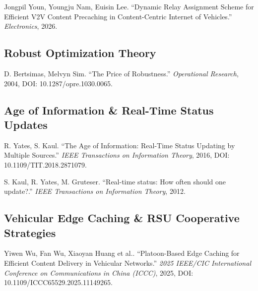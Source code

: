 \documentclass{article}
\begin{document}
Jongpil Youn, Youngju Nam, Euisin Lee. ``Dynamic Relay Assignment Scheme for Efficient V2V Content Precaching in Content-Centric Internet of Vehicles.'' 
\textit{Electronics}, 2026.



\subsection*{Robust Optimization Theory}

D. Bertsimas, Melvyn Sim. ``The Price of Robustness.'' 
\textit{Operational Research}, 2004, DOI: 10.1287/opre.1030.0065.



\subsection*{Age of Information \& Real-Time Status Updates}

R. Yates, S. Kaul. ``The Age of Information: Real-Time Status Updating by Multiple Sources.'' 
\textit{IEEE Transactions on Information Theory}, 2016, DOI: 10.1109/TIT.2018.2871079.

S. Kaul, R. Yates, M. Gruteser. ``Real-time status: How often should one update?.'' 
\textit{IEEE Transactions on Information Theory}, 2012.



\subsection*{Vehicular Edge Caching \& RSU Cooperative Strategies}

Yiwen Wu, Fan Wu, Xiaoyan Huang et al.. ``Platoon-Based Edge Caching for Efficient Content Delivery in Vehicular Networks.'' 
\textit{2025 IEEE/CIC International Conference on Communications in China (ICCC)}, 2025, DOI: 10.1109/ICCC65529.2025.11149265.
\end{document}
